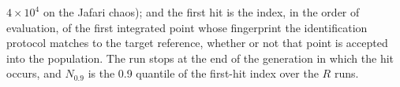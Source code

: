 $4\times10^4$ on the Jafari chaos); and the first hit is the index, in the order of evaluation, of the first integrated point whose fingerprint the identification protocol matches to the target reference, whether or not that point is accepted into the population. The run stops at the end of the generation in which the hit occurs, and $N_{0.9}$ is the 0.9 quantile of the first-hit index over the $R$ runs.
